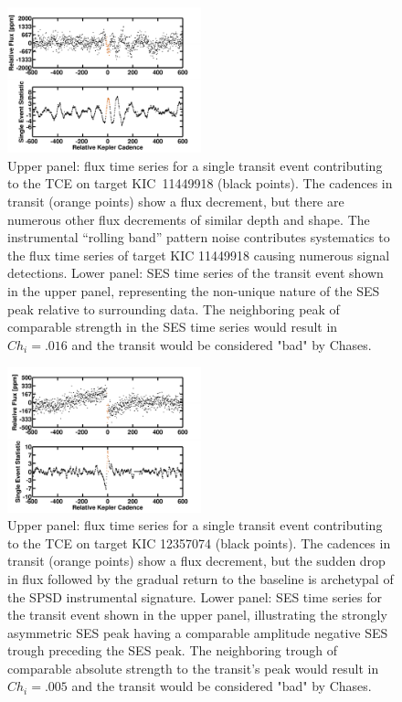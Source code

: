 \begin{figure}[htb]
\includegraphics[width=0.5\textwidth]{kic11449918_rb.pdf}
\caption{Upper panel: flux time series for a single transit event contributing to the TCE on target KIC~11449918 (black points).  The cadences in transit (orange points) show a flux decrement, but there are numerous other flux decrements of similar depth and shape.  The instrumental ``rolling band'' pattern noise contributes systematics to the flux time series of target KIC 11449918 causing numerous signal detections.  Lower panel: SES time series of the transit event shown in the upper panel, representing the non-unique nature of the SES peak relative to surrounding data. The neighboring peak of comparable strength in the SES time series would result in $Ch_{i}=.016$ and the transit would be considered "bad" by Chases. }
\label{fig:chases2}
\end{figure}

\begin{figure}[htb]
\includegraphics[width=0.5\textwidth]{kic12357074_spsd.pdf}
\caption{Upper panel: flux time series for a single transit event contributing to the TCE on target KIC 12357074 (black points).  The cadences in transit (orange points) show a flux decrement, but the sudden drop in flux followed by the gradual return to the baseline is archetypal of the SPSD instrumental signature.  Lower panel: SES time series for the transit event shown in the upper panel, illustrating the strongly asymmetric SES peak having a comparable amplitude negative SES trough preceding the SES peak. The neighboring trough of comparable absolute strength to the transit's peak would result in $Ch_{i}=.005$ and the transit would be considered "bad" by Chases.}
\label{fig:chases3}
\end{figure}



